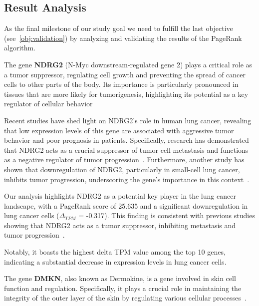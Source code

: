 \subsection{Result Analysis} \label{subsec:result_analysis}

As the final milestone of our study goal we need to fulfill the last objective  (see~\ref{obj:validation}) by analyzing and
validating the results of the PageRank algorithm.


The gene \textbf{NDRG2} (N-Myc downstream-regulated gene 2) plays a critical role as a tumor suppressor,
regulating cell growth and preventing the spread of cancer cells to other parts of the body.
Its importance is particularly pronounced in tissues that are more likely for tumorigenesis,
highlighting its potential as a key regulator of cellular behavior~\cite{Lee2022NDRG2}

Recent studies have shed light on NDRG2's role in human lung cancer,
revealing that low expression levels of this gene are associated with aggressive tumor behavior and poor prognosis in patients.
Specifically, research has demonstrated that NDRG2 acts as a crucial suppressor of tumor cell metastasis and
functions as a negative regulator of tumor progression~\cite{Li2013NDRG2}.
Furthermore, another study has shown that downregulation of NDRG2, particularly in small-cell lung cancer,
inhibits tumor progression, underscoring the gene's importance in this context~\cite{Ma2024NDRG2}.

Our analysis highlights NDRG2 as a potential key player in the lung cancer landscape,
with a PageRank score of 25.635 and a significant downregulation in lung cancer cells ($\Delta_{TPM}$ = -0.317).
This finding is consistent with previous studies showing that NDRG2 acts as a tumor suppressor,
inhibiting metastasis and tumor progression~\cite{Li2013NDRG2,Ma2024NDRG2}.

Notably, it boasts the highest delta TPM value among the top 10 genes,
indicating a substantial decrease in expression levels in lung cancer cells.
\newline

The gene \textbf{DMKN}, also known as Dermokine, is a gene involved in skin cell function and regulation.
Specifically, it plays a crucial role in maintaining the integrity of the outer layer of the skin
by regulating various cellular processes~\cite{Naso2007Deromokine}.

